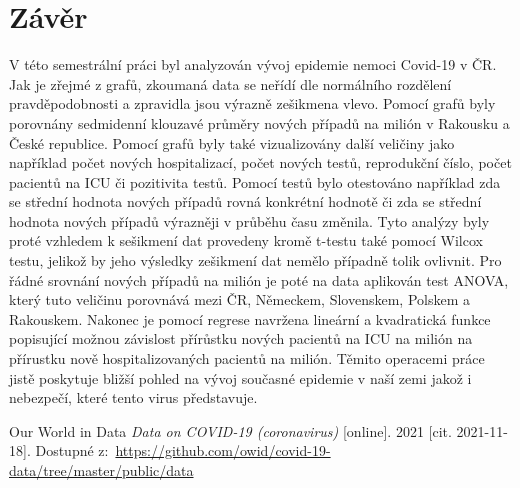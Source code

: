 \documentclass[a4paper, 12pt]{article}
\begin{document}
\clearpage


\clearpage {} {}
\section*{Závěr}

V této semestrální práci byl analyzován vývoj epidemie nemoci Covid-19 v ČR.
Jak je zřejmé z grafů, zkoumaná data se neřídí dle normálního rozdělení pravděpodobnosti
a zpravidla jsou výrazně zešikmena vlevo. Pomocí grafů byly porovnány sedmidenní klouzavé
průměry nových případů na milión v Rakousku a České republice. Pomocí grafů byly
také vizualizovány další veličiny jako například počet nových hospitalizací, počet nových testů,
reprodukční číslo, počet pacientů na ICU či pozitivita testů. Pomocí testů bylo otestováno například
zda se střední hodnota nových případů rovná konkrétní hodnotě či zda se střední hodnota
nových případů výrazněji v průběhu času změnila. Tyto analýzy byly proté vzhledem k sešikmení dat
provedeny kromě t-testu také pomocí Wilcox testu, jelikož by jeho výsledky zešikmení dat nemělo
případně tolik ovlivnit. Pro řádné srovnání nových případů na milión je poté na data aplikován
test ANOVA, který tuto veličinu porovnává mezi ČR, Německem, Slovenskem, Polskem a Rakouskem.
Nakonec je pomocí regrese navržena lineární a kvadratická funkce popisující možnou závislost
přírůstku nových pacientů na ICU na milión na přírustku nově hospitalizovaných pacientů na milión.
Těmito operacemi práce jistě poskytuje bližší pohled na vývoj současné epidemie v naší zemi
jakož i nebezpečí, které tento virus představuje.


\clearpage {} {}

\begin{thebibliography}{99}	%


Our World in Data
\textit{Data on COVID-19 (coronavirus)} [online]. 2021 [cit. 2021-11-18]. Dostupné z:~\url{https://github.com/owid/covid-19-data/tree/master/public/data}

\end{thebibliography}
\end{document}
